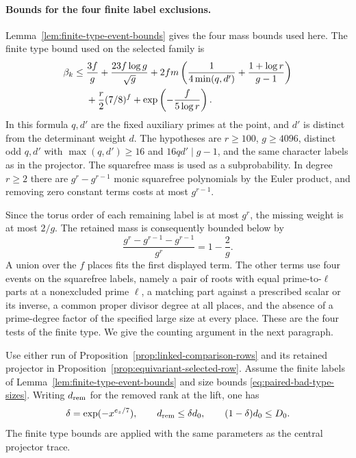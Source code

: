 \paragraph{Bounds for the four finite label exclusions.}
Lemma~\ref{lem:finite-type-event-bounds} gives the four mass
bounds used here.
The finite type bound used on the selected family is
\begin{align}
 \beta_k\le{}&\frac{3f}{g}+\frac{23 f\log g}{\sqrt g}
     +2fm\left(\frac1{4\min(q,d')}+\frac{1+\log r}{g-1}\right)
       \notag\\
     &+\frac r2(7/8)^f+\exp\left(-\frac{f}{5\log r}\right).
 \label{eq:row-bad-types}
\end{align}
In this formula $q,d'$ are the fixed auxiliary primes at the
point, and $d'$ is distinct from the determinant weight $d$.
The hypotheses are $r\ge100$, $g\ge4096$, distinct odd $q,d'$
with $\max(q,d')\ge16$ and $16qd'\mid g-1$, and the same
character labels as in the projector. The squarefree mass is used
as a subprobability. In degree $r\ge2$ there are $g^r-g^{r-1}$
monic squarefree polynomials by the Euler product, and removing
zero constant terms costs at most $g^{r-1}$.

Since the torus
order of each remaining label is at most $g^r$, the missing
weight is at most $2/g$.
The retained mass is consequently bounded below by
\[
  \frac{g^r-g^{r-1}-g^{r-1}}{g^r}=1-\frac2g .
\]
 A union over the $f$ places fits the
first displayed term. The other terms use four events on the
squarefree labels, namely a pair of roots with equal prime-to-$\ell$
parts at a nonexcluded prime $\ell$, a matching part against a
prescribed scalar or its inverse, a common proper divisor degree
at all places, and the absence of a prime-degree factor of the
specified large size at every place. These are the four tests of
the finite type. We give the counting argument in the next
paragraph.\label{cor:paired-good-share-4}



\begin{proposition}
\label{prop:paired-good-rank}
Use either run of Proposition~\ref{prop:linked-comparison-rows}
and its retained projector in
Proposition~\ref{prop:equivariant-selected-row}. Assume the
finite labels of Lemma~\ref{lem:finite-type-event-bounds} and
size bounds \eqref{eq:paired-bad-type-sizes}. Writing \(d_{\rm rem}\) for the removed rank at the lift, one has
\[
 \delta=\exp(-x^{e_z/7}),\qquad d_{\rm rem}\le\delta d_0,\qquad (1-\delta)d_0\le D_0.
\]
 The finite type bounds are applied
with the same parameters as the central projector trace.
\end{proposition}

